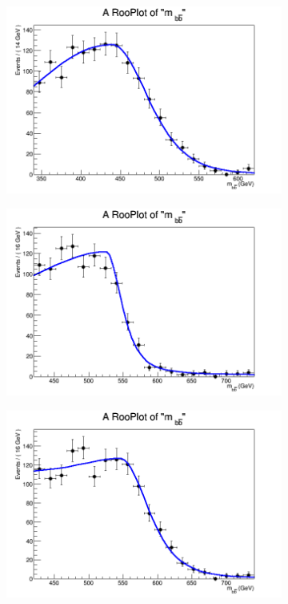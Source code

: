 \begin{figure}[phtb!]
\begin{center}
  \begin{subfigure}[$m_{A}=500$ GeV]{0.4\textwidth}\includegraphics[width=\textwidth]{FitResults/images/fitMC_bAbb500_5.png}\end{subfigure}
  \begin{subfigure}[$m_{A}=550$ GeV]{0.4\textwidth}\includegraphics[width=\textwidth]{FitResults/images/fitMC_bAbb550_5.png}\end{subfigure}
  \begin{subfigure}[$m_{A}=600$ GeV]{0.4\textwidth}\includegraphics[width=\textwidth]{FitResults/images/fitMC_bAbb600_5.png}\end{subfigure}

\end{center}
\end{figure}
